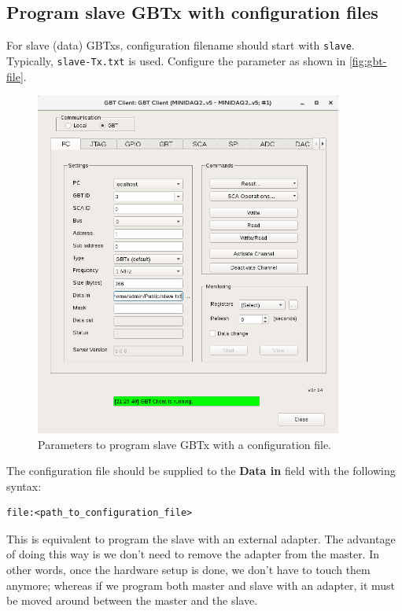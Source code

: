 \subsection{Program slave GBTx with configuration files}
For slave (data) GBTxs, configuration filename should start with \texttt{slave}.
Typically, \texttt{slave-Tx.txt} is used.
Configure the parameter as shown in \autoref{fig:gbt-file}.

\begin{figure}[ht]
	\centering
    \includegraphics[width=0.9\textwidth]{res/gbt_client_slave_program_via_config_file.png}
	\caption{Parameters to program slave GBTx with a configuration file.}
	\label{fig:gbt-file}
\end{figure}

The configuration file should be supplied to the \textbf{Data in} field with the
following syntax:

\begin{lstlisting}
file:<path_to_configuration_file>
\end{lstlisting}

\begin{leftbar}
    This is equivalent to program the slave with an external \itwoc adapter.
    The advantage of doing this way is we don't need to remove the \itwoc
    adapter from the master.
    In other words, once the hardware setup is done, we don't have to touch them
    anymore; whereas if we program both master and slave with an \itwoc adapter,
    it must be moved around between the master and the slave.
\end{leftbar}
